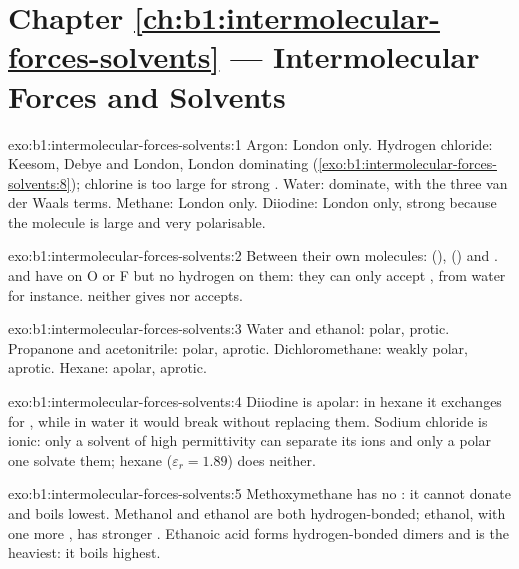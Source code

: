 \section*{Chapter \ref{ch:b1:intermolecular-forces-solvents} --- Intermolecular Forces and Solvents}

\begin{solution}{exo:b1:intermolecular-forces-solvents:1}
Argon: London only. Hydrogen chloride: Keesom, Debye and London, London
dominating (\cref{exo:b1:intermolecular-forces-solvents:8}); chlorine is
too large for strong . Water:  dominate, with
the three van der Waals terms. Methane: London only. Diiodine: London
only, strong because the molecule is large and very polarisable.
\end{solution}

\begin{solution}{exo:b1:intermolecular-forces-solvents:2}
Between their own molecules:  (), 
() and .  and  have  on O
or F but no hydrogen on them: they can only accept , from
water for instance.  neither gives nor accepts.
\end{solution}

\begin{solution}{exo:b1:intermolecular-forces-solvents:3}
Water and ethanol: polar, protic. Propanone and acetonitrile: polar,
aprotic. Dichloromethane: weakly polar, aprotic. Hexane: apolar, aprotic.
\end{solution}

\begin{solution}{exo:b1:intermolecular-forces-solvents:4}
Diiodine is apolar: in hexane it exchanges  for , while in water it would break  without
replacing them. Sodium chloride is ionic: only a solvent of high
permittivity can separate its ions and only a polar one solvate them;
hexane ($\varepsilon_r = 1.89$) does neither.
\end{solution}

\begin{solution}{exo:b1:intermolecular-forces-solvents:5}
Methoxymethane has no : it cannot donate  and boils
lowest. Methanol and ethanol are both hydrogen-bonded; ethanol, with one
more , has stronger . Ethanoic acid forms
hydrogen-bonded dimers and is the heaviest: it boils highest.
\end{solution}

